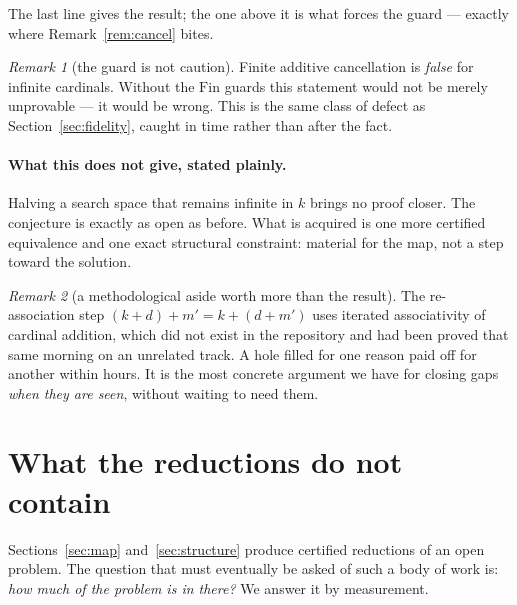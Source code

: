 \documentclass[11pt]{article}
\theoremstyle{remark}\newtheorem{remark}{Remark}
\begin{document}
\noindent
The last line gives the result; the one above it is what forces the guard --- exactly
where Remark~\ref{rem:cancel} bites.

\begin{remark}[the guard is not caution]
Finite additive cancellation is \emph{false} for infinite cardinals. Without the
$\mathrm{Fin}$ guards this statement would not be merely unprovable --- it would be
wrong. This is the same class of defect as Section~\ref{sec:fidelity}, caught in time
rather than after the fact.
\end{remark}

\paragraph{What this does not give, stated plainly.} Halving a search space that
remains infinite in $k$ brings no proof closer. The conjecture is exactly as open as
before. What is acquired is one more certified equivalence and one exact structural
constraint: material for the map, not a step toward the solution.

\begin{remark}[a methodological aside worth more than the result]
The re-association step $(k+d)+m' = k+(d+m')$ uses iterated associativity of cardinal
addition, which did not exist in the repository and had been proved that same morning
on an unrelated track. A hole filled for one reason paid off for another within hours.
It is the most concrete argument we have for closing gaps \emph{when they are seen},
without waiting to need them.
\end{remark}

\section{What the reductions do not contain}
\label{sec:abstract}

Sections~\ref{sec:map} and~\ref{sec:structure} produce certified reductions of an open
problem. The question that must eventually be asked of such a body of work is: \emph{how
much of the problem is in there?} We answer it by measurement.
\end{document}
